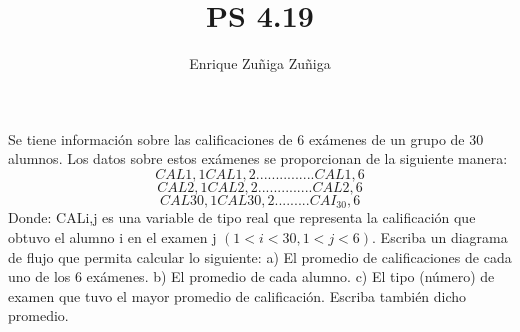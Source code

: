 \documentclass[11pt]{amsart}
\title{PS 4.19}
\author{Enrique Zuñiga Zuñiga}
\begin{document}
\maketitle
\noindent Se tiene información sobre las calificaciones de 6 exámenes de un grupo de 30 alumnos. Los datos sobre estos exámenes se proporcionan de la siguiente manera:\newline\newline
$$CAL1,1 CAL1,2 ...............CAL1,6  $$\newline
$$CAL2,1 CAL2, 2 ..............CAL2,6  $$\newline
$$CAL30,1 CAL30,2 .........CAI_30,6$$  \newline
Donde: CALi,j es una variable de tipo real que representa la calificación que obtuvo el alumno i en el examen j $(1 < i < 30, 1 < j < 6).$\newline\newline
Escriba un diagrama de flujo que permita calcular lo siguiente:\newline
a) El promedio de calificaciones de cada uno de los 6 exámenes.  \newline
b) El promedio de cada alumno.   \newline
c) El tipo (número) de examen que tuvo el mayor promedio de calificación. Escriba también dicho promedio.  \newline

\end{document}
